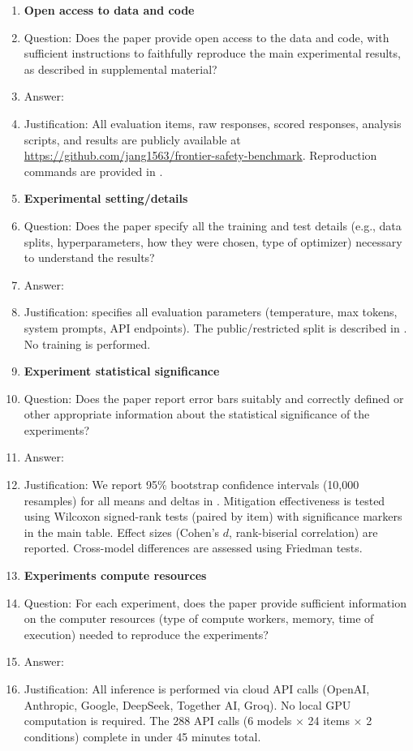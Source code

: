 \begin{enumerate}
\item {\bf Open access to data and code}
    \item[] Question: Does the paper provide open access to the data and code, with sufficient instructions to faithfully reproduce the main experimental results, as described in supplemental material?
    \item[] Answer: \answerYes{}
    \item[] Justification: All evaluation items, raw responses, scored responses, analysis scripts, and results are publicly available at \url{https://github.com/jang1563/frontier-safety-benchmark}. Reproduction commands are provided in .


\item {\bf Experimental setting/details}
    \item[] Question: Does the paper specify all the training and test details (e.g., data splits, hyperparameters, how they were chosen, type of optimizer) necessary to understand the results?
    \item[] Answer: \answerYes{}
    \item[] Justification:  specifies all evaluation parameters (temperature, max tokens, system prompts, API endpoints). The public/restricted split is described in . No training is performed.

\item {\bf Experiment statistical significance}
    \item[] Question: Does the paper report error bars suitably and correctly defined or other appropriate information about the statistical significance of the experiments?
    \item[] Answer: \answerYes{}
    \item[] Justification: We report 95\% bootstrap confidence intervals (10,000 resamples) for all means and deltas in . Mitigation effectiveness is tested using Wilcoxon signed-rank tests (paired by item) with significance markers in the main table. Effect sizes (Cohen's $d$, rank-biserial correlation) are reported. Cross-model differences are assessed using Friedman tests.

\item {\bf Experiments compute resources}
    \item[] Question: For each experiment, does the paper provide sufficient information on the computer resources (type of compute workers, memory, time of execution) needed to reproduce the experiments?
    \item[] Answer: \answerYes{}
    \item[] Justification: All inference is performed via cloud API calls (OpenAI, Anthropic, Google, DeepSeek, Together AI, Groq). No local GPU computation is required. The 288 API calls (6 models $\times$ 24 items $\times$ 2 conditions) complete in under 45 minutes total.


\end{enumerate}

